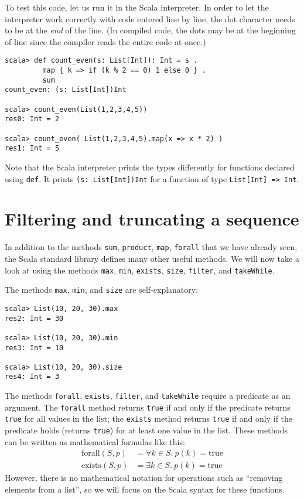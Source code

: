 To test this code, let us run it in the Scala interpreter. In order
to let the interpreter work correctly with code entered line by line,
the dot character needs to be at the \emph{end} of the line. (In compiled
code, the dots may be at the beginning of line since the compiler
reads the entire code at once.)
\begin{lstlisting}
scala> def count_even(s: List[Int]): Int = s .
         map { k => if (k % 2 == 0) 1 else 0 } .
         sum
count_even: (s: List[Int])Int

scala> count_even(List(1,2,3,4,5))
res0: Int = 2

scala> count_even( List(1,2,3,4,5).map(x => x * 2) )
res1: Int = 5
\end{lstlisting}
Note that the Scala interpreter prints the types differently for functions
declared using \lstinline!def!. It prints \lstinline!(s: List[Int])Int!
for a function of type \lstinline!List[Int] => Int!.

\section{Filtering and truncating a sequence }

In addition to the methods \lstinline!sum!, \lstinline!product!,
\lstinline!map!, \texttt{}\lstinline!forall! that we have already
seen, the Scala standard library defines many other useful methods.
We will now take a look at using the methods \lstinline!max!, \lstinline!min!,
\lstinline!exists!, \lstinline!size!, \lstinline!filter!, and \lstinline!takeWhile!. 

The methods \lstinline!max!, \lstinline!min!, and \texttt{}\lstinline!size!
are self-explanatory:
\begin{lstlisting}
scala> List(10, 20, 30).max
res2: Int = 30

scala> List(10, 20, 30).min
res3: Int = 10

scala> List(10, 20, 30).size
res4: Int = 3
\end{lstlisting}

The methods \lstinline!forall!, \lstinline!exists!, \lstinline!filter!,
and \texttt{}\lstinline!takeWhile! require a predicate as an argument.
The \texttt{}\lstinline!forall! method returns \texttt{}\lstinline!true!
if and only if the predicate returns \lstinline!true! for all values
in the list; the \texttt{}\lstinline!exists! method returns \texttt{}\lstinline!true!
if and only if the predicate holds (returns \lstinline!true!) for
at least one value in the list. These methods can be written as mathematical
formulas like this:
\begin{align*}
\text{forall}\left(S,p\right) & =\forall k\in S.~p(k)=\text{true}\\
\text{exists}\left(S,p\right) & =\exists k\in S.~p(k)=\text{true}
\end{align*}
However, there is no mathematical notation for operations such as
\textsf{``}removing elements from a list\textsf{''}, so we will focus on the Scala
syntax for these functions.

